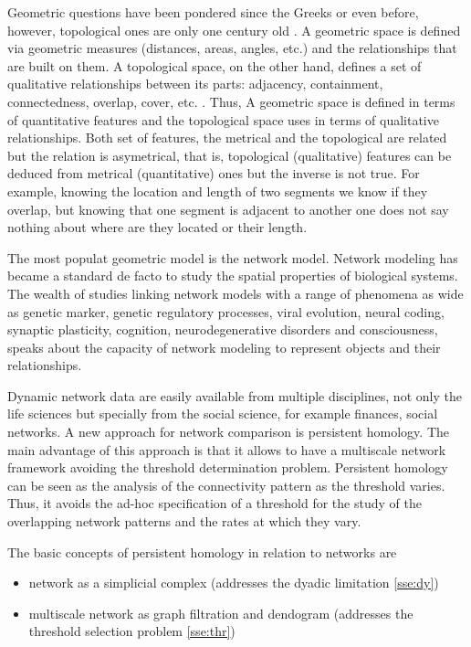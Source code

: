 \documentclass[onecollarge,runningheads]{svjour2}
\begin{document}
Geometric questions have been pondered since the Greeks or even before, however, topological ones are only one century old  \cite{edelsbrunner2010computational}. A geometric space is defined via geometric measures (distances, areas, angles, etc.) and the relationships that are built on them. A topological space, on the other hand, defines a set of qualitative relationships between its parts: adjacency, containment, connectedness, overlap, cover, etc. \cite{aleksandrov1999mathematics}. Thus, A geometric space is defined in terms of quantitative features and the topological space uses
in terms of qualitative relationships.  Both set of features, the metrical and the topological are related but the relation is asymetrical, that is, topological (qualitative) features can be deduced from metrical (quantitative) ones but the inverse is not true. For example, knowing the location and length of two segments we know if they overlap, but knowing that one segment is adjacent to another one does not say nothing about where are they located or their length.

The most populat geometric model is the network model. Network modeling has became a standard de facto to study the spatial properties of biological systems. The wealth of studies linking network models with a range of phenomena as wide as genetic marker, genetic regulatory processes, viral evolution, neural coding, synaptic plasticity, cognition, neurodegenerative disorders and consciousness, speaks about the capacity of network modeling to represent objects and their relationships. 

Dynamic network data are easily available from multiple disciplines, not only the life sciences but specially from the social science, for example finances, social networks. A new approach for network comparison is persistent homology. The main advantage of this approach is that it allows to have a multiscale network framework avoiding the threshold determination problem. Persistent homology can be seen as the analysis of the connectivity pattern as the threshold varies. Thus, it avoids the ad-hoc specification of a threshold for the study of the overlapping network patterns and the rates at which they vary.


The basic concepts of persistent homology in relation to networks are
\begin{itemize}
\item network as a simplicial complex (addresses the dyadic limitation \ref{sse:dy})
\item multiscale network as graph filtration and dendogram (addresses the threshold selection problem \ref{sse:thr})
\end{itemize}
\end{document}
